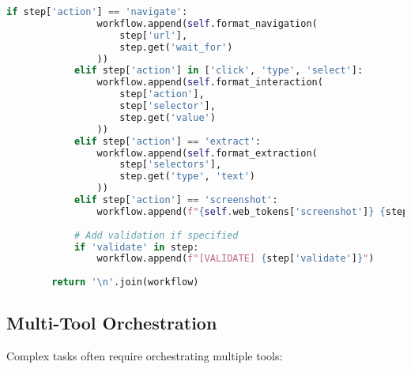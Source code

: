 \begin{lstlisting}[language=Python, caption=Web scraping and browser automation tokens]
            if step['action'] == 'navigate':
                workflow.append(self.format_navigation(
                    step['url'],
                    step.get('wait_for')
                ))
            elif step['action'] in ['click', 'type', 'select']:
                workflow.append(self.format_interaction(
                    step['action'],
                    step['selector'],
                    step.get('value')
                ))
            elif step['action'] == 'extract':
                workflow.append(self.format_extraction(
                    step['selectors'],
                    step.get('type', 'text')
                ))
            elif step['action'] == 'screenshot':
                workflow.append(f"{self.web_tokens['screenshot']} {step.get('filename', 'screenshot.png')}")
            
            # Add validation if specified
            if 'validate' in step:
                workflow.append(f"[VALIDATE] {step['validate']}")
        
        return '\n'.join(workflow)
\end{lstlisting}

\subsection{Multi-Tool Orchestration}

Complex tasks often require orchestrating multiple tools:

